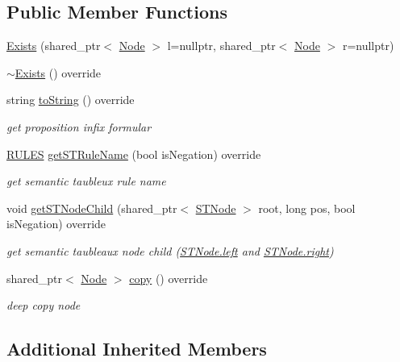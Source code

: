 \subsection*{Public Member Functions}
\begin{DoxyCompactItemize}
\item 
\hyperlink{class_exists_ae51931aa14079e565a7b700b8f1d1fb1}{Exists} (shared\+\_\+ptr$<$ \hyperlink{class_node}{Node} $>$ l=nullptr, shared\+\_\+ptr$<$ \hyperlink{class_node}{Node} $>$ r=nullptr)
\item 
\hyperlink{class_exists_a12ebe07a95afddca068d6cbdd67508f2}{$\sim$\+Exists} () override
\item 
string \hyperlink{class_exists_a8eda64d4fd60158c15b38f64a4596068}{to\+String} () override
\begin{DoxyCompactList}\small\item\em get proposition infix formular \end{DoxyCompactList}\item 
\hyperlink{proposition_2tableaux_2enum_8h_a70c93904c6a27d228050f922eb4fc3b8}{R\+U\+L\+ES} \hyperlink{class_exists_aff7b8694345884d06bdd751e88fae041}{get\+S\+T\+Rule\+Name} (bool is\+Negation) override
\begin{DoxyCompactList}\small\item\em get semantic taubleux rule name \end{DoxyCompactList}\item 
void \hyperlink{class_exists_ad60177b343503d1ee8bdda801c2d32d6}{get\+S\+T\+Node\+Child} (shared\+\_\+ptr$<$ \hyperlink{class_s_t_node}{S\+T\+Node} $>$ root, long pos, bool is\+Negation) override
\begin{DoxyCompactList}\small\item\em get semantic taubleaux node child (\hyperlink{class_s_t_node_a19ba8bab4660bdeee0e897687b451a8b}{S\+T\+Node.\+left} and \hyperlink{class_s_t_node_a66d06118063fb739058f91c75b725e27}{S\+T\+Node.\+right}) \end{DoxyCompactList}\item 
shared\+\_\+ptr$<$ \hyperlink{class_node}{Node} $>$ \hyperlink{class_exists_a135277d9bfed780d4ea493ef355055d4}{copy} () override
\begin{DoxyCompactList}\small\item\em deep copy node \end{DoxyCompactList}\end{DoxyCompactItemize}
\subsection*{Additional Inherited Members}


